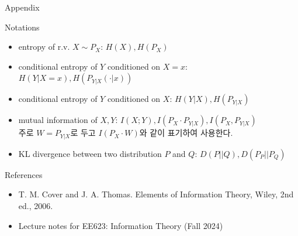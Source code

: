 \documentclass[9pt]{beamer}
\begin{document}
    \begin{frame}{Appendix}
        \begin{block}{Notations}
            \begin{itemize}
                \item entropy of r.v. $X \sim P_X$: $H(X), H(P_X)$
                \item conditional entropy of $Y$ conditioned on $X=x$: $H(Y|X=x) , H(P_{Y|X}(\cdot|x))$
                \item conditional entropy of $Y$ conditioned on $X$: $H(Y|X) , H(P_{Y|X})$
                \item mutual information of $X, Y$: $I(X;Y), I(P_X \cdot P_{Y|X}), I(P_X , P_{Y|X})$ \\
                주로 $W= P_{Y|X}$로 두고 $I(P_X \cdot W)$와 같이 표기하여 사용한다.
                \item KL divergence between two distribution $P$ and $Q$: $D(P||Q),  D(P_P||P_Q)$
            \end{itemize}
        \end{block}
    \end{frame}

    \begin{frame}{References}
        \begin{itemize}
            \item T. M. Cover and J. A. Thomas. Elements of Information Theory, Wiley, 2nd ed., 2006.
            \item Lecture notes for EE623: Information Theory (Fall 2024)
        \end{itemize}
        \vspace{6cm}
    \end{frame}
\end{document}
